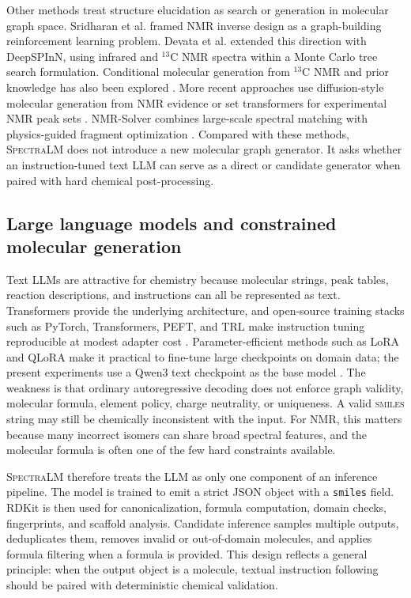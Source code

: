 \documentclass{article}
\newcommand{\smiles}{\textsc{smiles}}
\newcommand{\spectralm}{\textsc{SpectraLM}}
\begin{document}
Other methods treat structure elucidation as search or generation in molecular graph space. Sridharan et al. \cite{Sridharan2022} framed NMR inverse design as a graph-building reinforcement learning problem. Devata et al. \cite{Devata2024} extended this direction with DeepSPInN, using infrared and \(^{13}\)C NMR spectra within a Monte Carlo tree search formulation. Conditional molecular generation from \(^{13}\)C NMR and prior knowledge has also been explored \cite{Yao2023}. More recent approaches use diffusion-style molecular generation from NMR evidence \cite{Xiong2025,Yang2025} or set transformers for experimental NMR peak sets \cite{Yang2026}. NMR-Solver combines large-scale spectral matching with physics-guided fragment optimization \cite{Jin2026}. Compared with these methods, \spectralm{} does not introduce a new molecular graph generator. It asks whether an instruction-tuned text LLM can serve as a direct or candidate generator when paired with hard chemical post-processing.

\subsection{Large language models and constrained molecular generation}

Text LLMs are attractive for chemistry because molecular strings, peak tables, reaction descriptions, and instructions can all be represented as text. Transformers \cite{Vaswani2017} provide the underlying architecture, and open-source training stacks such as PyTorch, Transformers, PEFT, and TRL make instruction tuning reproducible at modest adapter cost \cite{Paszke2019,Wolf2020,Mangrulkar2022,VonWerra2020}. Parameter-efficient methods such as LoRA \cite{Hu2021LoRA} and QLoRA \cite{Dettmers2023QLoRA} make it practical to fine-tune large checkpoints on domain data; the present experiments use a Qwen3 text checkpoint as the base model \cite{QwenTeam2025}. The weakness is that ordinary autoregressive decoding does not enforce graph validity, molecular formula, element policy, charge neutrality, or uniqueness. A valid \smiles{} string \cite{Weininger1988} may still be chemically inconsistent with the input. For NMR, this matters because many incorrect isomers can share broad spectral features, and the molecular formula is often one of the few hard constraints available.

\spectralm{} therefore treats the LLM as only one component of an inference pipeline. The model is trained to emit a strict JSON object with a \texttt{smiles} field. RDKit \cite{RDKit} is then used for canonicalization, formula computation, domain checks, fingerprints, and scaffold analysis. Candidate inference samples multiple outputs, deduplicates them, removes invalid or out-of-domain molecules, and applies formula filtering when a formula is provided. This design reflects a general principle: when the output object is a molecule, textual instruction following should be paired with deterministic chemical validation.
\end{document}
